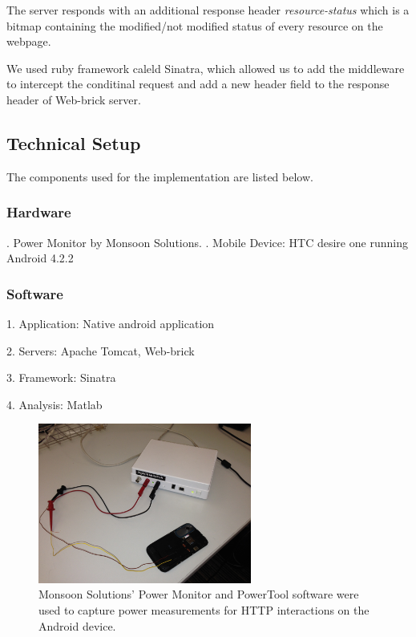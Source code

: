 \documentclass{sigplanconf}
\begin{document}
The server responds with an additional response header {\it resource-status} which is a bitmap containing the modified/not modified status of every resource on the webpage. 

We used ruby framework caleld Sinatra, which allowed us to add the middleware to intercept the conditinal request and add a new header field to the response header of Web-brick server.

\subsection{Technical Setup}
The components used for the implementation are listed below.

\subsubsection{Hardware}

. Power Monitor by Monsoon Solutions. . Mobile Device: HTC desire one running Android 4.2.2 

\subsubsection{Software}

1. Application: Native android application

2. Servers: Apache Tomcat, Web-brick

3. Framework: Sinatra

4. Analysis: Matlab

\begin{figure}[ht!]
\centering
\includegraphics[width=70mm]{monitor.jpg}
\caption{Monsoon Solutions’ Power Monitor and PowerTool software were used to capture power measurements for HTTP interactions on the Android device. }
\label{fig:sp_gd_mnist}
\end{figure}
\end{document}
